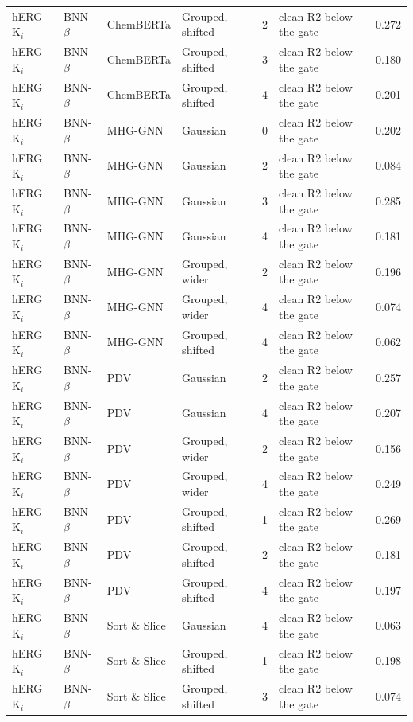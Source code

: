 {\begin{longtable}{llllcll}
hERG K$_i$ & BNN-$\beta$ & ChemBERTa & Grouped, shifted & 2 & clean R2 below the gate & 0.272 \\
hERG K$_i$ & BNN-$\beta$ & ChemBERTa & Grouped, shifted & 3 & clean R2 below the gate & 0.180 \\
hERG K$_i$ & BNN-$\beta$ & ChemBERTa & Grouped, shifted & 4 & clean R2 below the gate & 0.201 \\
hERG K$_i$ & BNN-$\beta$ & MHG-GNN & Gaussian & 0 & clean R2 below the gate & 0.202 \\
hERG K$_i$ & BNN-$\beta$ & MHG-GNN & Gaussian & 2 & clean R2 below the gate & 0.084 \\
hERG K$_i$ & BNN-$\beta$ & MHG-GNN & Gaussian & 3 & clean R2 below the gate & 0.285 \\
hERG K$_i$ & BNN-$\beta$ & MHG-GNN & Gaussian & 4 & clean R2 below the gate & 0.181 \\
hERG K$_i$ & BNN-$\beta$ & MHG-GNN & Grouped, wider & 2 & clean R2 below the gate & 0.196 \\
hERG K$_i$ & BNN-$\beta$ & MHG-GNN & Grouped, wider & 4 & clean R2 below the gate & 0.074 \\
hERG K$_i$ & BNN-$\beta$ & MHG-GNN & Grouped, shifted & 4 & clean R2 below the gate & 0.062 \\
hERG K$_i$ & BNN-$\beta$ & PDV & Gaussian & 2 & clean R2 below the gate & 0.257 \\
hERG K$_i$ & BNN-$\beta$ & PDV & Gaussian & 4 & clean R2 below the gate & 0.207 \\
hERG K$_i$ & BNN-$\beta$ & PDV & Grouped, wider & 2 & clean R2 below the gate & 0.156 \\
hERG K$_i$ & BNN-$\beta$ & PDV & Grouped, wider & 4 & clean R2 below the gate & 0.249 \\
hERG K$_i$ & BNN-$\beta$ & PDV & Grouped, shifted & 1 & clean R2 below the gate & 0.269 \\
hERG K$_i$ & BNN-$\beta$ & PDV & Grouped, shifted & 2 & clean R2 below the gate & 0.181 \\
hERG K$_i$ & BNN-$\beta$ & PDV & Grouped, shifted & 4 & clean R2 below the gate & 0.197 \\
hERG K$_i$ & BNN-$\beta$ & Sort \& Slice & Gaussian & 4 & clean R2 below the gate & 0.063 \\
hERG K$_i$ & BNN-$\beta$ & Sort \& Slice & Grouped, shifted & 1 & clean R2 below the gate & 0.198 \\
hERG K$_i$ & BNN-$\beta$ & Sort \& Slice & Grouped, shifted & 3 & clean R2 below the gate & 0.074 \\

\end{longtable}}
